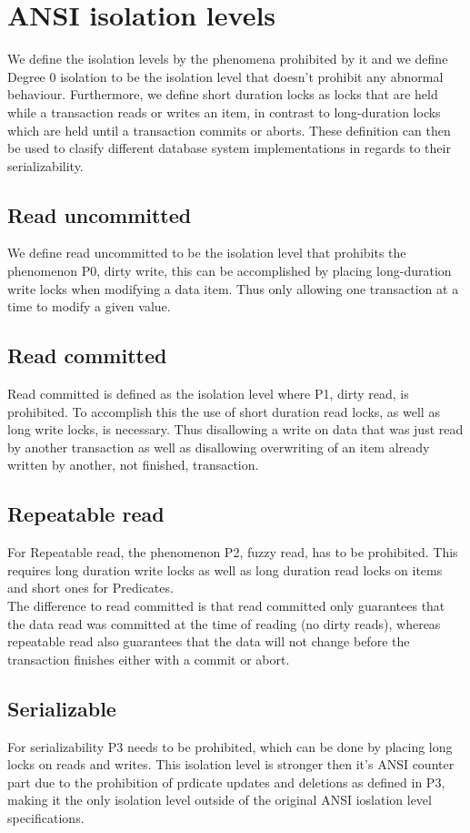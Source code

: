 \documentclass[sigconf, review=true]{acmart}
\begin{document}
\section{ANSI isolation levels}
We define the isolation levels by the phenomena prohibited by it and we define
Degree 0 isolation to be the isolation level that doesn’t prohibit any abnormal
behaviour. Furthermore, we define short duration locks as locks that are held
while a transaction reads or writes an item, in contrast to long-duration locks which are
held until a transaction commits or aborts.
These definition can then be used to clasify different database system implementations in
regards to their serializability.

\subsection{Read uncommitted}
We define read uncommitted to be the isolation level that prohibits the phenomenon
P0, dirty write, this can be accomplished by placing long-duration write locks when modifying a data item.
Thus only allowing one transaction at a time to modify a given value.

\subsection{Read committed}
Read committed is defined as the isolation level where P1, dirty read, is prohibited.
To accomplish this the use of short duration read locks, as well as long write locks, is
necessary. Thus disallowing a write on data that was just read by another transaction as
well as disallowing overwriting of an item already written by another, not finished, transaction.

\subsection{Repeatable read}
For Repeatable read, the phenomenon P2, fuzzy read, has to be prohibited.
This requires long duration write locks as well as long duration read locks on
items and short ones for Predicates.\\
The difference to read committed is that read committed only guarantees that
the data read was committed at the time of reading (no dirty reads), whereas
repeatable read also guarantees that the data will not change before the
transaction finishes either with a commit or abort.


\subsection{Serializable}
For serializability P3 needs to be prohibited, which can be done by placing long locks
on reads and writes. This isolation level is stronger then it's ANSI counter part due to the
prohibition of prdicate updates and deletions as defined in P3, making it the only isolation level
outside of the original ANSI ioslation level specifications.
\end{document}

